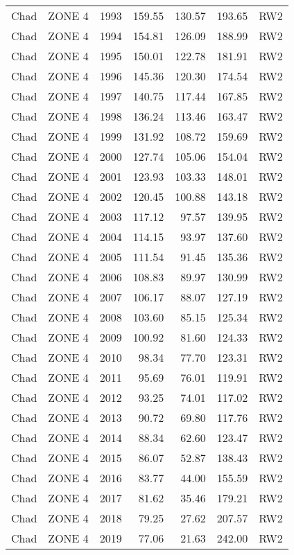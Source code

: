 \begin{longtable}{lllrrrl}
  Chad & ZONE 4 & 1993 & 159.55 & 130.57 & 193.65 & RW2 \\ 
  Chad & ZONE 4 & 1994 & 154.81 & 126.09 & 188.99 & RW2 \\ 
  Chad & ZONE 4 & 1995 & 150.01 & 122.78 & 181.91 & RW2 \\ 
  Chad & ZONE 4 & 1996 & 145.36 & 120.30 & 174.54 & RW2 \\ 
  Chad & ZONE 4 & 1997 & 140.75 & 117.44 & 167.85 & RW2 \\ 
  Chad & ZONE 4 & 1998 & 136.24 & 113.46 & 163.47 & RW2 \\ 
  Chad & ZONE 4 & 1999 & 131.92 & 108.72 & 159.69 & RW2 \\ 
  Chad & ZONE 4 & 2000 & 127.74 & 105.06 & 154.04 & RW2 \\ 
  Chad & ZONE 4 & 2001 & 123.93 & 103.33 & 148.01 & RW2 \\ 
  Chad & ZONE 4 & 2002 & 120.45 & 100.88 & 143.18 & RW2 \\ 
  Chad & ZONE 4 & 2003 & 117.12 & 97.57 & 139.95 & RW2 \\ 
  Chad & ZONE 4 & 2004 & 114.15 & 93.97 & 137.60 & RW2 \\ 
  Chad & ZONE 4 & 2005 & 111.54 & 91.45 & 135.36 & RW2 \\ 
  Chad & ZONE 4 & 2006 & 108.83 & 89.97 & 130.99 & RW2 \\ 
  Chad & ZONE 4 & 2007 & 106.17 & 88.07 & 127.19 & RW2 \\ 
  Chad & ZONE 4 & 2008 & 103.60 & 85.15 & 125.34 & RW2 \\ 
  Chad & ZONE 4 & 2009 & 100.92 & 81.60 & 124.33 & RW2 \\ 
  Chad & ZONE 4 & 2010 & 98.34 & 77.70 & 123.31 & RW2 \\ 
  Chad & ZONE 4 & 2011 & 95.69 & 76.01 & 119.91 & RW2 \\ 
  Chad & ZONE 4 & 2012 & 93.25 & 74.01 & 117.02 & RW2 \\ 
  Chad & ZONE 4 & 2013 & 90.72 & 69.80 & 117.76 & RW2 \\ 
  Chad & ZONE 4 & 2014 & 88.34 & 62.60 & 123.47 & RW2 \\ 
  Chad & ZONE 4 & 2015 & 86.07 & 52.87 & 138.43 & RW2 \\ 
  Chad & ZONE 4 & 2016 & 83.77 & 44.00 & 155.59 & RW2 \\ 
  Chad & ZONE 4 & 2017 & 81.62 & 35.46 & 179.21 & RW2 \\ 
  Chad & ZONE 4 & 2018 & 79.25 & 27.62 & 207.57 & RW2 \\ 
  Chad & ZONE 4 & 2019 & 77.06 & 21.63 & 242.00 & RW2 \\ 

\end{longtable}
